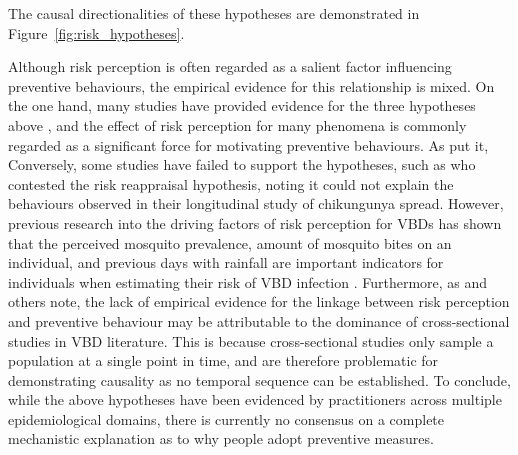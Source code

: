 The causal directionalities of these hypotheses are demonstrated in Figure~\ref{fig:risk_hypotheses}.



Although risk perception is often regarded as a salient factor influencing preventive behaviours, the empirical evidence for this relationship is mixed. On the one hand, many studies have provided evidence for the three hypotheses above \cite{brewer_risk_2004, lopes-rafegas_contribution_2023, aerts_understanding_2020, qin_exploring_2021}, and the effect of risk perception for many phenomena is commonly regarded as a significant force for motivating preventive behaviours. As \citet{tan_severe_2004} put it,  Conversely, some studies have failed to support the hypotheses, such as \citet{raude_understanding_2019} who contested the risk reappraisal hypothesis, noting it could not explain the behaviours observed in their longitudinal study of chikungunya spread. However, previous research into the driving factors of risk perception for VBDs has shown that the perceived mosquito prevalence, amount of mosquito bites on an individual, and previous days with rainfall are important indicators for individuals when estimating their risk of VBD infection \cite{raude_public_2012, lopes-rafegas_contribution_2023, constant_ecology_2020}. Furthermore, as \citet{qin_exploring_2021} and others note, the lack of empirical evidence for the linkage between risk perception and preventive behaviour may be attributable to the dominance of cross-sectional studies in VBD literature. This is because cross-sectional studies only sample a population at a single point in time, and are therefore problematic for demonstrating causality as no temporal sequence can be established. To conclude, while the above hypotheses have been evidenced by practitioners across multiple epidemiological domains, there is currently no consensus on a complete mechanistic explanation as to why people adopt preventive measures.

